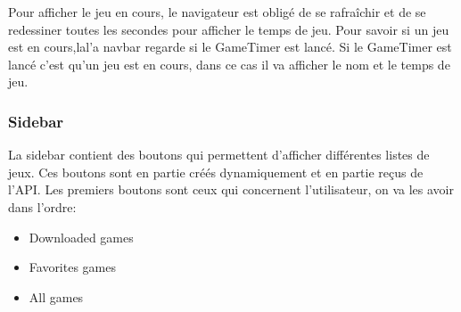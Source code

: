 \documentclass[a4paper,12pt,french]{sphinxmanual}
\begin{document}
\sphinxAtStartPar
Pour afficher le jeu en cours, le navigateur est obligé de se rafraîchir et de se redessiner toutes les secondes pour afficher le temps de jeu. Pour savoir si un jeu est en cours,lal’a navbar regarde si le GameTimer est lancé. Si le GameTimer est lancé c’est qu’un jeu est en cours, dans ce cas il va afficher le nom et le temps de jeu.

\begin{sphinxVerbatim}[commandchars=\\\{\}]
     
               
                   
                            
                      
                  
\end{sphinxVerbatim}


\subsubsection{Sidebar}
\label{\detokenize{organique:sidebar}}
\sphinxAtStartPar
La sidebar contient des boutons qui permettent d’afficher différentes listes de jeux. Ces boutons sont en partie créés dynamiquement et en partie reçus de l’API. Les premiers boutons sont ceux qui concernent l’utilisateur, on va les avoir dans l’ordre:
\begin{itemize}
\item {} 
\sphinxAtStartPar
Downloaded games

\item {} 
\sphinxAtStartPar
Favorites games

\item {} 
\sphinxAtStartPar
All games

\end{itemize}
\end{document}
